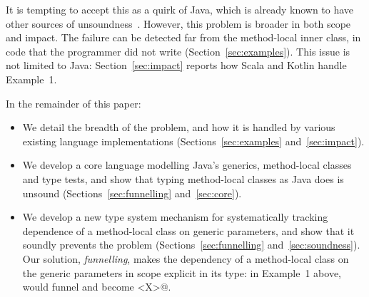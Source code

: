 It is tempting to accept this as a quirk of Java, which is already known to have other sources of unsoundness~\cite{amin2016java}.
However, this problem is broader in both scope and impact.
The failure can be detected far from the method-local inner class, in code that the programmer did not write (Section~\ref{sec:examples}).
This issue is not limited to Java:
Section~\ref{sec:impact} reports how Scala and Kotlin handle Example~1.

In the remainder of this paper:
\begin{itemize}
\item We detail the breadth of the problem, and how it is handled by various existing language implementations (Sections~\ref{sec:examples} and~\ref{sec:impact}).
\item We develop a core language modelling Java's generics, method-local classes and type tests, and show that typing method-local classes as Java does is unsound (Sections~\ref{sec:funnelling} and~\ref{sec:core}).
\item We develop a new type system mechanism for systematically tracking dependence of a
method-local class on generic parameters, and show that it soundly prevents the problem (Sections~\ref{sec:funnelling} and~\ref{sec:soundness}).
Our solution, \emph{funnelling}, makes the dependency of a method-local class on the generic parameters in scope explicit in its type:
in Example~1 above, \Q@MyFoo@ would funnel \Q@X@ and become \Q@MyFoo<X>@.
\end{itemize}
